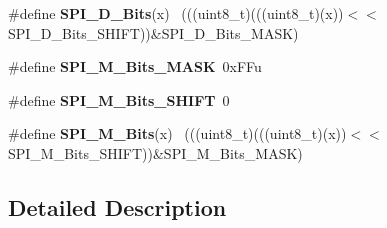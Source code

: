 \begin{DoxyCompactItemize}
\item 
\hypertarget{group___s_p_i___register___masks_gabf32dda963f16f1f1ba52f8f29832898}{}\#define {\bfseries S\+P\+I\+\_\+\+D\+\_\+\+Bits}(x)                                                    ~(((uint8\+\_\+t)(((uint8\+\_\+t)(x))$<$$<$S\+P\+I\+\_\+\+D\+\_\+\+Bits\+\_\+\+S\+H\+I\+F\+T))\&S\+P\+I\+\_\+\+D\+\_\+\+Bits\+\_\+\+M\+A\+S\+K)\label{group___s_p_i___register___masks_gabf32dda963f16f1f1ba52f8f29832898}

\item 
\hypertarget{group___s_p_i___register___masks_ga9767f876397867fe5481f0f2e8fe7426}{}\#define {\bfseries S\+P\+I\+\_\+\+M\+\_\+\+Bits\+\_\+\+M\+A\+S\+K}~0x\+F\+Fu\label{group___s_p_i___register___masks_ga9767f876397867fe5481f0f2e8fe7426}

\item 
\hypertarget{group___s_p_i___register___masks_ga260750fc368376f78fd1fbdea6353327}{}\#define {\bfseries S\+P\+I\+\_\+\+M\+\_\+\+Bits\+\_\+\+S\+H\+I\+F\+T}~0\label{group___s_p_i___register___masks_ga260750fc368376f78fd1fbdea6353327}

\item 
\hypertarget{group___s_p_i___register___masks_ga2775c569f5357859c2f77a5afcf3ff2a}{}\#define {\bfseries S\+P\+I\+\_\+\+M\+\_\+\+Bits}(x)                                                    ~(((uint8\+\_\+t)(((uint8\+\_\+t)(x))$<$$<$S\+P\+I\+\_\+\+M\+\_\+\+Bits\+\_\+\+S\+H\+I\+F\+T))\&S\+P\+I\+\_\+\+M\+\_\+\+Bits\+\_\+\+M\+A\+S\+K)\label{group___s_p_i___register___masks_ga2775c569f5357859c2f77a5afcf3ff2a}

\end{DoxyCompactItemize}


\subsection{Detailed Description}
